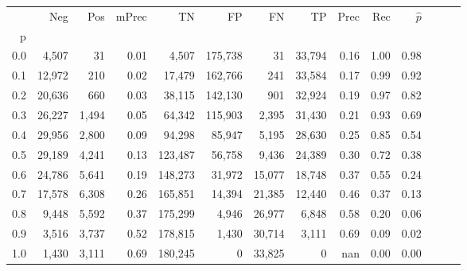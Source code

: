 \begin{tabular}{rrrrrrrrrrrrrr}
\toprule
{} &     Neg &    Pos & mPrec &       TN &       FP &      FN &      TP &  Prec &   Rec & $\hat{p}$ \\
p   &         &        &       &          &          &         &         &       &       &           \\
\midrule
0.0 &   4,507 &     31 &  0.01 &    4,507 &  175,738 &      31 &  33,794 &  0.16 &  1.00 &      0.98 \\
0.1 &  12,972 &    210 &  0.02 &   17,479 &  162,766 &     241 &  33,584 &  0.17 &  0.99 &      0.92 \\
0.2 &  20,636 &    660 &  0.03 &   38,115 &  142,130 &     901 &  32,924 &  0.19 &  0.97 &      0.82 \\
0.3 &  26,227 &  1,494 &  0.05 &   64,342 &  115,903 &   2,395 &  31,430 &  0.21 &  0.93 &      0.69 \\
0.4 &  29,956 &  2,800 &  0.09 &   94,298 &   85,947 &   5,195 &  28,630 &  0.25 &  0.85 &      0.54 \\
0.5 &  29,189 &  4,241 &  0.13 &  123,487 &   56,758 &   9,436 &  24,389 &  0.30 &  0.72 &      0.38 \\
0.6 &  24,786 &  5,641 &  0.19 &  148,273 &   31,972 &  15,077 &  18,748 &  0.37 &  0.55 &      0.24 \\
0.7 &  17,578 &  6,308 &  0.26 &  165,851 &   14,394 &  21,385 &  12,440 &  0.46 &  0.37 &      0.13 \\
0.8 &   9,448 &  5,592 &  0.37 &  175,299 &    4,946 &  26,977 &   6,848 &  0.58 &  0.20 &      0.06 \\
0.9 &   3,516 &  3,737 &  0.52 &  178,815 &    1,430 &  30,714 &   3,111 &  0.69 &  0.09 &      0.02 \\
1.0 &   1,430 &  3,111 &  0.69 &  180,245 &        0 &  33,825 &       0 &   nan &  0.00 &      0.00 \\
\bottomrule
\end{tabular}
